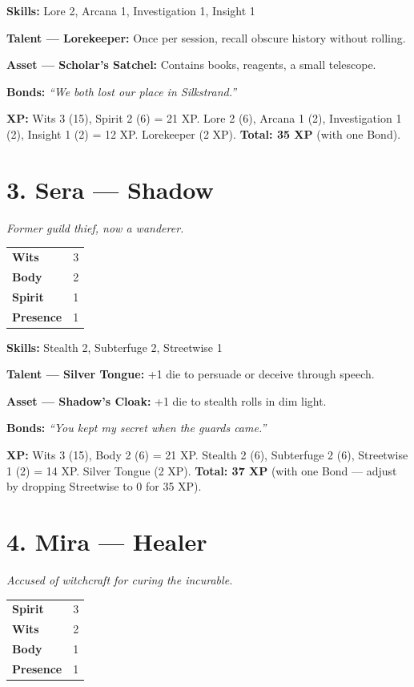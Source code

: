 \documentclass[11pt]{book}
\begin{document}
\textbf{Skills:} Lore 2, Arcana 1, Investigation 1, Insight 1

\textbf{Talent --- Lorekeeper:} Once per session, recall obscure history without rolling.

\textbf{Asset --- Scholar's Satchel:} Contains books, reagents, a small telescope.

\textbf{Bonds:} \textit{``We both lost our place in Silkstrand.''}

\textbf{XP:} Wits 3 (15), Spirit 2 (6) = 21 XP. Lore 2 (6), Arcana 1 (2), Investigation 1 (2), Insight 1 (2) = 12 XP. Lorekeeper (2 XP). \textbf{Total: 35 XP} (with one Bond).

\section*{3. Sera --- Shadow}

\textit{Former guild thief, now a wanderer.}

\begin{tabular}{ll}
\textbf{Wits} & 3 \\
\textbf{Body} & 2 \\
\textbf{Spirit} & 1 \\
\textbf{Presence} & 1 \\
\end{tabular}

\textbf{Skills:} Stealth 2, Subterfuge 2, Streetwise 1

\textbf{Talent --- Silver Tongue:} +1 die to persuade or deceive through speech.

\textbf{Asset --- Shadow's Cloak:} +1 die to stealth rolls in dim light.

\textbf{Bonds:} \textit{``You kept my secret when the guards came.''}

\textbf{XP:} Wits 3 (15), Body 2 (6) = 21 XP. Stealth 2 (6), Subterfuge 2 (6), Streetwise 1 (2) = 14 XP. Silver Tongue (2 XP). \textbf{Total: 37 XP} (with one Bond --- adjust by dropping Streetwise to 0 for 35 XP).

\section*{4. Mira --- Healer}

\textit{Accused of witchcraft for curing the incurable.}

\begin{tabular}{ll}
\textbf{Spirit} & 3 \\
\textbf{Wits} & 2 \\
\textbf{Body} & 1 \\
\textbf{Presence} & 1 \\
\end{tabular}
\end{document}
